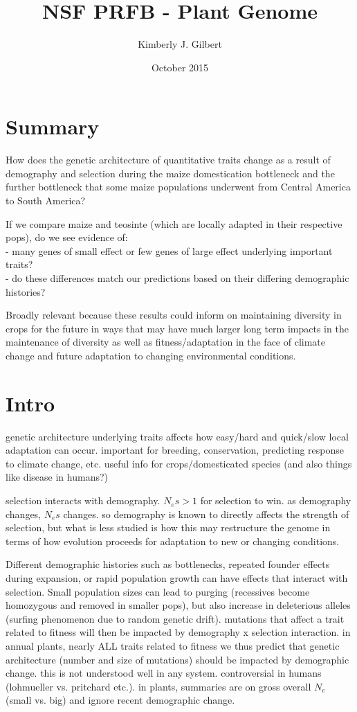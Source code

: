 \documentclass[10pt, letterpaper]{article}
\title{NSF PRFB - Plant Genome}
\author{Kimberly J. Gilbert}
\date{October 2015}
\begin{document}
\section{Summary}

How does the genetic architecture of quantitative traits change as a result of demography and selection during the maize domestication bottleneck and the further bottleneck that some maize populations underwent from Central America to South America?
	
If we compare maize and teosinte (which are locally adapted in their respective pops), do we see evidence of:\\
	\indent - many genes of small effect or few genes of large effect underlying important traits?\\
	\indent - do these differences match our predictions based on their differing demographic histories?
	
Broadly relevant because these results could inform on maintaining diversity in crops for the future in ways that may have much larger long term impacts in the maintenance of diversity as well as fitness/adaptation in the face of climate change and future adaptation to changing environmental conditions.

\section*{Intro}
	
genetic architecture underlying traits affects how easy/hard and quick/slow local adaptation can occur. important for breeding, conservation, predicting response to climate change, etc.
useful info for crops/domesticated species (and also things like disease in humans?)
	
selection interacts with demography. $N_es>1$ for selection to win.
as demography changes, $N_es$ changes.
so demography is known to directly affects the strength of selection, but what is less studied is how this may restructure the genome in terms of how evolution proceeds for adaptation to new or changing conditions.

Different demographic histories such as bottlenecks, repeated founder effects during expansion, or rapid population growth can have effects that interact with selection.
Small population sizes can lead to purging (recessives become homozygous and removed in smaller pops), but also increase in deleterious alleles (surfing phenomenon due to random genetic drift).
mutations that affect a trait related to fitness will then be impacted by demography x selection interaction.
in annual plants, nearly ALL traits related to fitness
we thus predict that genetic architecture (number and size of mutations) should be impacted by demographic change.
this is not understood well in any system. controversial in humans (lohmueller vs. pritchard etc.). in plants, summaries are on gross overall $N_e$ (small vs. big) and ignore recent demographic change.
\end{document}
